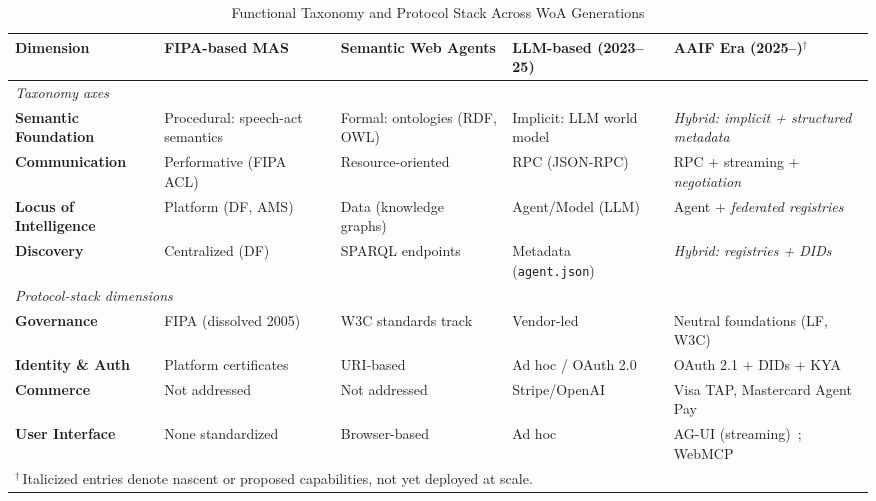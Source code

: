 \documentclass{IEEEcsmag}
\begin{document}
\begin{table}[!t]
\centering
\caption{Functional Taxonomy and Protocol Stack Across WoA Generations}
\label{tab:taxonomy}
\begin{tabularx}{\textwidth}{|l|X|X|X|X|}
\hline
\textbf{Dimension} & \textbf{FIPA-based MAS} & \textbf{Semantic Web Agents} & \textbf{LLM-based (2023--25)} & \textbf{AAIF Era (2025--)$^\dagger$} \\
\hline
\multicolumn{5}{|l|}{\textit{Taxonomy axes}} \\
\hline
\textbf{Semantic Foundation} & Procedural: speech-act semantics~\cite{FIPA_2002} & Formal: ontologies (RDF, OWL)~\cite{Berners-Lee_2001, Hogan_2020} & Implicit: LLM world model~\cite{Brown_2020} & \emph{Hybrid: implicit + structured metadata}~\cite{AAIF_2025, A2A_v03_2025} \\
\hline
\textbf{Communication} & Performative (FIPA ACL)~\cite{FIPA_2002} & Resource-oriented~\cite{Ciortea_2019} & RPC (JSON-RPC)~\cite{MCP_2025, Google_2025_A2A} & RPC + streaming + \emph{negotiation}~\cite{A2A_v03_2025} \\
\hline
\textbf{Locus of Intelligence} & Platform (DF, AMS)~\cite{Poslad_2007} & Data (knowledge graphs)~\cite{Berners-Lee_2001} & Agent/Model (LLM)~\cite{Yao_2023, Schick_2023} & Agent + \emph{federated registries}~\cite{AAIF_2025} \\
\hline
\textbf{Discovery} & Centralized (DF)~\cite{Poslad_2007} & SPARQL endpoints~\cite{Hogan_2020} & Metadata (\texttt{agent.json})~\cite{Google_2025_A2A} & \emph{Hybrid: registries + DIDs}~\cite{AAIF_2025, W3C_ANP_2025} \\
\hline
\multicolumn{5}{|l|}{\textit{Protocol-stack dimensions}} \\
\hline
\textbf{Governance} & FIPA (dissolved 2005)~\cite{Poslad_2007} & W3C standards track & Vendor-led~\cite{MCP_2025, Google_2025_A2A} & Neutral foundations (LF, W3C)~\cite{AAIF_2025, A2A_LinuxFoundation_2025} \\
\hline
\textbf{Identity \& Auth} & Platform certificates~\cite{Poslad_2007} & URI-based & Ad hoc / OAuth 2.0 & OAuth 2.1 + DIDs + KYA~\cite{MCP_Tasks_2025, W3C_ANP_2025, KYA_Paradigm_2025} \\
\hline
\textbf{Commerce} & Not addressed & Not addressed & Stripe/OpenAI~\cite{Stripe_OpenAI_ACP_2025} & Visa TAP, Mastercard Agent Pay~\cite{Visa_TAP_2025, Mastercard_AgentPay_2025} \\
\hline
\textbf{User Interface} & None standardized & Browser-based & Ad hoc & AG-UI (streaming)~\cite{AGUI_2025}; WebMCP~\cite{WebMCP_W3C_2025} \\
\hline
\multicolumn{5}{l}{\footnotesize $^\dagger$\,Italicized entries denote nascent or proposed capabilities, not yet deployed at scale.}
\end{tabularx}
\end{table}
\end{document}
